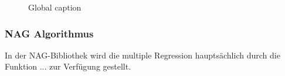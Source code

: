 \begin{figure}[t]
  \centering
  \begin{narrow}{-0.2\textwidth}{0.2\textwidth}
    \caption{Global caption}
  \end{narrow}
  \label{fig:nm_wfl_distributions}
\end{figure}

\subsubsection{NAG Algorithmus}

In der NAG-Bibliothek wird die multiple Regression hauptsächlich durch die Funktion ... zur Verfügung gestellt.
 

